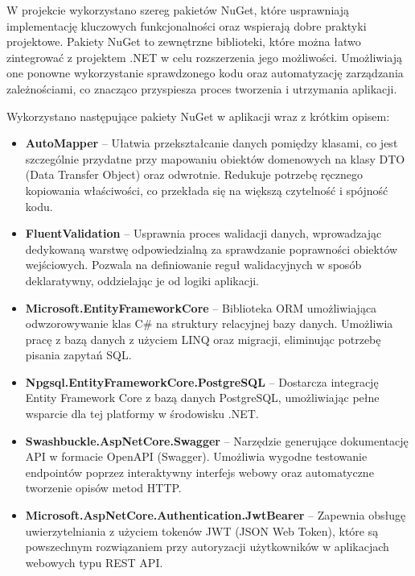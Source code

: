 W projekcie wykorzystano szereg pakietów NuGet, które usprawniają implementację kluczowych funkcjonalności oraz wspierają dobre praktyki projektowe. Pakiety NuGet to zewnętrzne biblioteki, które można łatwo zintegrować z projektem .NET w celu rozszerzenia jego możliwości. Umożliwiają one ponowne wykorzystanie sprawdzonego kodu oraz automatyzację zarządzania zależnościami, co znacząco przyspiesza proces tworzenia i utrzymania aplikacji.

Wykorzystano następujące pakiety NuGet w aplikacji wraz z krótkim opisem:

\begin{itemize}
    \item \textbf{AutoMapper} – Ułatwia przekształcanie danych pomiędzy klasami, co jest szczególnie przydatne przy mapowaniu obiektów domenowych na klasy DTO (Data Transfer Object) oraz odwrotnie. Redukuje potrzebę ręcznego kopiowania właściwości, co przekłada się na większą czytelność i spójność kodu.

    \item \textbf{FluentValidation} – Usprawnia proces walidacji danych, wprowadzając dedykowaną warstwę odpowiedzialną za sprawdzanie poprawności obiektów wejściowych. Pozwala na definiowanie reguł walidacyjnych w sposób deklaratywny, oddzielając je od logiki aplikacji.

    \item \textbf{Microsoft.EntityFrameworkCore} – Biblioteka ORM umożliwiająca odwzorowywanie klas C\# na struktury relacyjnej bazy danych. Umożliwia pracę z bazą danych z użyciem LINQ oraz migracji, eliminując potrzebę pisania zapytań SQL.

    \item \textbf{Npgsql.EntityFrameworkCore.PostgreSQL} – Dostarcza integrację Entity Framework Core z bazą danych PostgreSQL, umożliwiając pełne wsparcie dla tej platformy w środowisku .NET.

    \item \textbf{Swashbuckle.AspNetCore.Swagger} – Narzędzie generujące dokumentację API w formacie OpenAPI (Swagger). Umożliwia wygodne testowanie endpointów poprzez interaktywny interfejs webowy oraz automatyczne tworzenie opisów metod HTTP.

    \item \textbf{Microsoft.AspNetCore.Authentication.JwtBearer} – Zapewnia obsługę uwierzytelniania z użyciem tokenów JWT (JSON Web Token), które są powszechnym rozwiązaniem przy autoryzacji użytkowników w aplikacjach webowych typu REST API.


\end{itemize}
